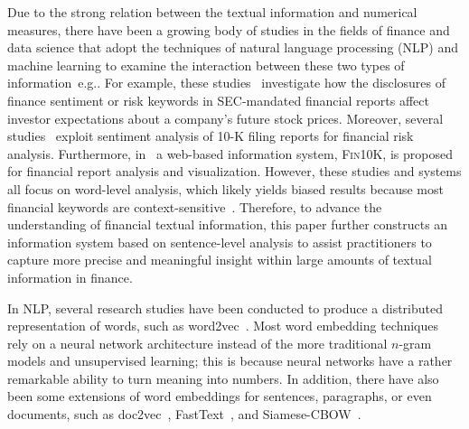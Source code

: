 \documentclass[10pt,conference,letterpaper]{IEEEtran}
\begin{document}
    Due to the strong relation between the textual information and numerical measures, there have been a growing body of studies in the fields of finance and data science that adopt the techniques of natural language processing (NLP) and machine learning to examine the interaction between these two types of information~e.g.\cite{kogan2009predicting,tsai2017risk,Tsai:2016:DFK:2991040.2948072,rekabsaz2017volatility}. For example, these studies~\cite{loughran2011liability,jegadeesh2013word} investigate how the disclosures of finance sentiment or risk keywords in SEC-mandated financial reports affect investor expectations about a company's future stock prices. Moreover, several studies~\cite{kogan2009predicting,tsai2017risk} exploit sentiment analysis of 10-K filing reports for financial risk analysis. Furthermore, in~\cite{liu2016fin10k} a web-based information system, \textsc{Fin10K}, is proposed for financial report analysis and visualization. However, these studies and systems all focus on word-level analysis, which likely yields biased results because most financial keywords are context-sensitive~\cite{liu2016fin10k}. Therefore, to advance the understanding of financial textual information, this paper further constructs an information system based on sentence-level analysis to assist practitioners to capture more precise and meaningful insight within large amounts of textual information in finance.

    In NLP, several research studies have been conducted to produce a distributed representation of words, such as word2vec~\cite{Mikolov:2013:DRW:2999792.2999959}. Most word embedding techniques rely on a neural network architecture instead of the more traditional $n$-gram models and unsupervised learning; this is because neural networks have a rather remarkable ability to turn meaning into numbers. In addition, there have also been some extensions of word embeddings for sentences, paragraphs, or even documents, such as doc2vec~\cite{Mikolov:2013:DRW:2999792.2999959}, FastText~\cite{bojanowski2016enriching}, and Siamese-CBOW~\cite{kenter2016siamese}.
\end{document}
